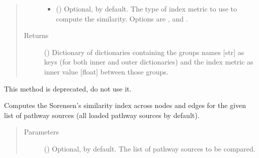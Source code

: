 \documentclass[letterpaper,10pt,english]{sphinxmanual}
\begin{document}
\begin{fulllineitems}
\begin{fulllineitems}
\begin{quote}
\begin{description}
\begin{itemize}
\item {} 
 () \textendash{} Optional,  by default. The type of index metric
to use to compute the similarity. Options are ,
 and .

\end{itemize}

\item[{Returns}] \leavevmode
() \textendash{} Dictionary of dictionaries containing the groups
names {[}str{]} as keys (for both inner and outer dictionaries)
and the index metric as inner value {[}float{]} between those
groups.

\end{description}\end{quote}

\end{fulllineitems}


\begin{fulllineitems}
\label{\detokenize{reference:pypath.main.PyPath.small_plot}}
This method is deprecated, do not use it.

\end{fulllineitems}


\begin{fulllineitems}
\label{\detokenize{reference:pypath.main.PyPath.sorensen_pathways}}
Computes the Sorensen’s similarity index across nodes and edges
for the given list of pathway sources (all loaded pathway
sources by default).
\begin{quote}\begin{description}
\item[{Parameters}] \leavevmode
{} () \textendash{} Optional,  by default. The list of pathway sources
to be compared.


\end{description}
\end{quote}
\end{fulllineitems}
\end{fulllineitems}
\end{document}
